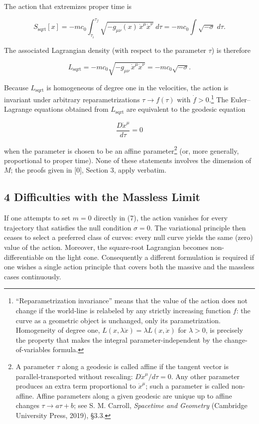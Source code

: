 \documentclass[
]{article}
\begin{document}
The action that extremizes proper time is

\[S_{\mathrm{sqrt}}[x] = -mc_{0} \int_{\tau_{i}}^{\tau_{f}} \sqrt{-g_{\mu\nu}(x)\, \dot{x}^{\mu} \dot{x}^{\nu}}\; d\tau = -mc_{0} \int \sqrt{-\sigma}\; d\tau. \tag{6}\]

The associated Lagrangian density (with respect to the parameter
\(\tau\)) is therefore

\[L_{\mathrm{sqrt}} = -mc_{0}\sqrt{-g_{\mu\nu}\, \dot{x}^{\mu} \dot{x}^{\nu}} = -mc_{0}\sqrt{-\sigma}. \tag{7}\]

Because \(L_{\mathrm{sqrt}}\) is homogeneous of degree one in the
velocities, the action is invariant under arbitrary reparametrizations
\(\tau \to f(\tau)\) with \(\dot{f} > 0\).\footnote{``Reparametrization
  invariance'' means that the value of the action does not change if the
  world-line is relabeled by any strictly increasing function \(f\): the
  curve as a geometric object is unchanged, only its parametrization.
  Homogeneity of degree one,
  \(L(x, \lambda \dot{x}) = \lambda L(x, \dot{x})\) for \(\lambda > 0\),
  is precisely the property that makes the integral
  parameter-independent by the change-of-variables formula.} The
Euler--Lagrange equations obtained from \(L_{\mathrm{sqrt}}\) are
equivalent to the geodesic equation

\[\frac{D \dot{x}^{\mu}}{d\tau} = 0 \tag{8}\]

when the parameter is chosen to be an affine parameter\footnote{A
  parameter \(\tau\) along a geodesic is called affine if the tangent
  vector is parallel-transported without rescaling:
  \(D\dot{x}^{\mu}/d\tau = 0\). Any other parameter produces an extra
  term proportional to \(\dot{x}^{\mu}\); such a parameter is called
  non-affine. Affine parameters along a given geodesic are unique up to
  affine changes \(\tau \to a\tau + b\); see S. M. Carroll,
  \emph{Spacetime and Geometry} (Cambridge University Press, 2019),
  §3.3.} (or, more generally, proportional to proper time). None of
these statements involves the dimension of \(M\); the proofs given in
{[}0{]}, Section 3, apply verbatim.

\hypertarget{difficulties-with-the-massless-limit}{%
\subsection{4 Difficulties with the Massless
Limit}\label{difficulties-with-the-massless-limit}}

If one attempts to set \(m = 0\) directly in (7), the action vanishes
for every trajectory that satisfies the null condition \(\sigma = 0\).
The variational principle then ceases to select a preferred class of
curves: every null curve yields the same (zero) value of the action.
Moreover, the square-root Lagrangian becomes non-differentiable on the
light cone. Consequently a different formulation is required if one
wishes a single action principle that covers both the massive and the
massless cases continuously.
\end{document}
